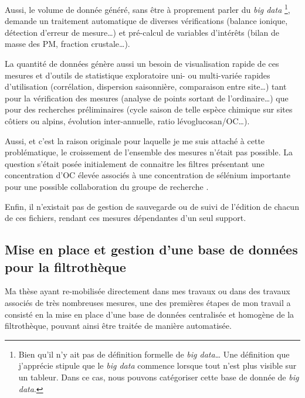 Aussi, le volume de donnée généré, sans être à proprement parler du \textit{big data}
\footnote{Bien qu'il n'y ait pas de définition formelle de \textit{big data}…  Une
    définition que j'apprécie stipule que le \textit{big data} commence lorsque tout
    n'est plus visible sur un tableur. Dans ce cas, nous pouvons catégoriser cette base de
donnée de \textit{big data}.},
demande un traitement automatique de diverses vérifications (balance ionique, détection
d'erreur de mesure…) et pré-calcul de variables d'intérêts (bilan de masse des PM,
fraction crustale…).

La quantité de données génère aussi un besoin de visualisation rapide de ces mesures et
d'outils de statistique exploratoire uni- ou multi-variée rapides d'utilisation
(corrélation, dispersion saisonnière, comparaison entre site…) tant pour la vérification
des mesures (analyse de points sortant de l'ordinaire…) que pour des recherches
préliminaires (cycle saison de telle espèce chimique sur sites côtiers ou alpins, évolution
inter-annuelle, ratio lévoglucosan/OC…).

Aussi, et c'est la raison originale pour laquelle je me suis attaché à cette
problématique, le croissement de l'ensemble des mesures n'était pas possible. La question
s'était posée initialement de connaitre les filtres présentant une concentration d'OC
élevée associés à une concentration de sélénium importante pour une possible collaboration
du groupe de recherche \parencite{toluDistribution2014,luxemStudying2017}.

Enfin, il n'existait pas de gestion de sauvegarde ou de suivi de l'édition
de chacun de ces fichiers, rendant ces mesures dépendantes d'un seul support.

\subsection{Mise en place et gestion d'une base de données pour la filtrothèque}%
\label{sub:mise_en_place_et_gestion_d_une_base_de_donnée_pour_la_filtrothèque}

\begin{tcolorbox}[colback=red!5!white,colframe=Melon,title=Note]
Ma thèse ayant re-mobilisée directement dans mes travaux ou dans des travaux associés de
très nombreuses mesures, une des premières étapes de mon travail a consisté en la mise en place d'une
base de données centralisée et homogène de la filtrothèque, pouvant ainsi être traitée de
manière automatisée.
\end{tcolorbox}

